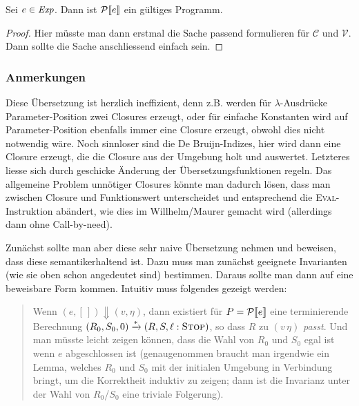 \documentclass[12pt,fleqn]{article}
\begin{document}
\begin{lemma}
  Sei $e\in{\text{\it Exp\/}}$. Dann ist $\mathcal{P}\llbracket e \rrbracket$ ein g\"ultiges Programm.
\end{lemma}

\begin{proof}
  Hier m\"usste man dann erstmal die Sache passend formulieren f\"ur $\mathcal{C}$ und $\mathcal{V}$. Dann
  sollte die Sache anschliessend einfach sein.
\end{proof}


\subsubsection{Anmerkungen}

Diese \"Ubersetzung ist herzlich ineffizient, denn z.B. werden f\"ur $\lambda$-Ausdr\"ucke Parameter-Position
zwei Closures erzeugt, oder f\"ur einfache Konstanten wird auf Parameter-Position ebenfalls immer eine Closure
erzeugt, obwohl dies nicht notwendig w\"are. Noch sinnloser sind die De Bruijn-Indizes, hier wird dann eine
Closure erzeugt, die die Closure aus der Umgebung holt und auswertet. Letzteres liesse sich durch geschicke
\"Anderung der \"Ubersetzungsfunktionen regeln. Das allgemeine Problem unn\"otiger Closures k\"onnte man dadurch
l\"osen, dass man zwischen Closure und Funktionswert unterscheidet und entsprechend die \textsc{Eval}-Instruktion
ab\"andert, wie dies im Willhelm/Maurer gemacht wird (allerdings dann ohne Call-by-need).

Zun\"achst sollte man aber diese sehr naive \"Ubersetzung nehmen und beweisen, dass diese semantikerhaltend ist. Dazu
muss man zun\"achst geeignete Invarianten (wie sie oben schon angedeutet sind) bestimmen. Daraus sollte man dann
auf eine beweisbare Form kommen. Intuitiv muss folgendes gezeigt werden:
\begin{quote}
  Wenn $(e,[\,]) \Downarrow (v,\eta)$, dann existiert f\"ur $P=\mathcal{P}\llbracket e \rrbracket$ eine terminierende Berechnung
  $(R_0,S_0,0) \xrightarrow* (R,S,\ell:\textsc{Stop})$, so dass $R$ zu $(v\,\eta)$ {\em passt}. Und
  man m\"usste leicht zeigen k\"onnen, dass die Wahl von $R_0$ und $S_0$ egal ist wenn $e$ abgeschlossen ist
  (genaugenommen braucht man irgendwie ein Lemma, welches $R_0$ und $S_0$ mit der initialen Umgebung in Verbindung
  bringt, um die
  Korrektheit induktiv zu zeigen; dann ist die Invarianz unter der Wahl von $R_0$/$S_0$ eine triviale Folgerung).
\end{quote}
\end{document}
